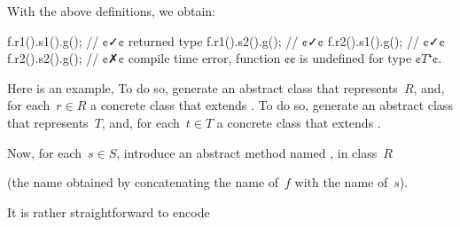With the above definitions, we obtain:
  \begin{JAVA}
f.r1().s1().g(); // ¢✓¢ returned type
f.r1().s2().g(); // ¢✓¢
f.r2().s1().g(); // ¢✓¢
f.r2().s2().g(); // ¢✗¢ compile time error, function ¢¢ is undefined for type ¢$T⁺$¢.
\end{JAVA}

Here is an example,
To do so, generate an abstract class  that represents~$R$, and,
  for each~$r∈R$ a concrete class  that extends .
To do so, generate an abstract class  that represents~$T$, and,
  for each~$t∈T$ a concrete class  that extends .

Now, for each~$s∈S$, introduce an abstract method named ,
  in class~$R$

(the name obtained by
  concatenating the name of~$f$ with the name of~$s$).

It is rather straightforward to encode
